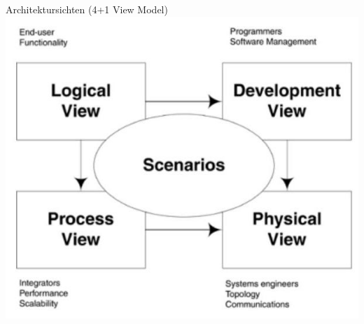\begin{concept}{Architektursichten (4+1 View Model)}
\includegraphics[width=0.9\linewidth]{images/2024_12_29_0d1d7b5551ea1b4b41bdg-09}
\end{concept}

